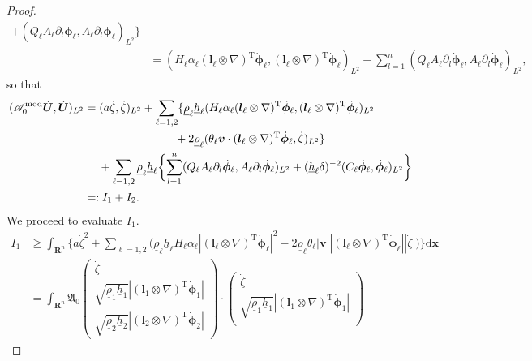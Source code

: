 \documentclass[11pt,leqno]{article}
\numberwithin{equation}{section}
\numberwithin{figure}{section}
\begin{document}
\begin{proof}
\begin{align*}
 + (Q_\ell A_\ell\partial_l\dot{\bm{\phi}}_\ell,A_\ell\partial_l\dot{\bm{\phi}}_\ell)_{L^2} \} \\
&= (H_\ell\alpha_\ell (\bm{l}_\ell\otimes\nabla)^\mathrm{T}\dot{\bm{\phi}}_\ell, 
  (\bm{l}_\ell\otimes\nabla)^\mathrm{T}\dot{\bm{\phi}}_\ell)_{L^2}
 + \sum_{l=1}^n(Q_\ell A_\ell\partial_l\dot{\bm{\phi}}_\ell,A_\ell\partial_l\dot{\bm{\phi}}_\ell)_{L^2},
\end{align*}
%
so that 
%
\begin{align*}
(\mathscr{A}_0^\mathrm{mod}\dot{\bm{U}},\dot{\bm{U}})_{L^2}
&= (a\dot{\zeta},\dot{\zeta})_{L^2}
 + \sum_{\ell=1,2} \{ \underline{\rho}_\ell\underline{h}_\ell
   (H_\ell\alpha_\ell (\bm{l}_\ell\otimes\nabla)^\mathrm{T}\dot{\bm{\phi}}_\ell, 
    (\bm{l}_\ell\otimes\nabla)^\mathrm{T}\dot{\bm{\phi}}_\ell)_{L^2} \\
&\makebox[8em]{}
  + 2\underline{\rho}_\ell(\theta_\ell\bm{v}\cdot(\bm{l}_\ell\otimes\nabla)^\mathrm{T}\dot{\bm{\phi}}_\ell, \dot{\zeta})_{L^2} \} \\
&\quad\;
 + \sum_{\ell=1,2} \underline{\rho}_\ell\underline{h}_\ell \biggl\{
  \sum_{l=1}^n (Q_\ell A_\ell\partial_l\dot{\bm{\phi}}_\ell,A_\ell\partial_l\dot{\bm{\phi}}_\ell)_{L^2}
  + (\underline{h}_\ell\delta)^{-2}(C_\ell\dot{\bm{\phi}}_\ell,\dot{\bm{\phi}}_\ell)_{L^2} \biggr\} \\
&=: I_1+I_2.
\end{align*}
%
We proceed to evaluate $I_1$. 
%
\begin{align*}
I_1 &\geq \int_{\mathbf{R}^n}\biggl\{ a\dot{\zeta}^2
 + \sum_{\ell=1,2}\bigl(
  \underline{\rho}_\ell\underline{h}_\ell H_\ell\alpha_\ell|(\bm{l}_\ell\otimes\nabla)^\mathrm{T}\dot{\bm{\phi}}_\ell|^2
 - 2\underline{\rho}_\ell\theta_\ell|\bm{v}||(\bm{l}_\ell\otimes\nabla)^\mathrm{T}\dot{\bm{\phi}}_\ell||\dot{\zeta}| \bigr)
 \biggr\}\mathrm{d}\bm{x} \\
&= \int_{\mathbf{R}^n} \mathfrak{A}_0
\begin{pmatrix}
 \dot{\zeta} \\ 
 \sqrt{ \underline{\rho}_1\underline{h}_1 } |(\bm{l}_1\otimes\nabla)^\mathrm{T}\dot{\bm{\phi}}_1| \\
 \sqrt{ \underline{\rho}_2\underline{h}_2 } |(\bm{l}_2\otimes\nabla)^\mathrm{T}\dot{\bm{\phi}}_2|
\end{pmatrix}
\cdot
\begin{pmatrix}
 \dot{\zeta} \\ 
 \sqrt{ \underline{\rho}_1\underline{h}_1 } |(\bm{l}_1\otimes\nabla)^\mathrm{T}\dot{\bm{\phi}}_1| \\

\end{pmatrix}
\end{align*}
\end{proof}
\end{document}
